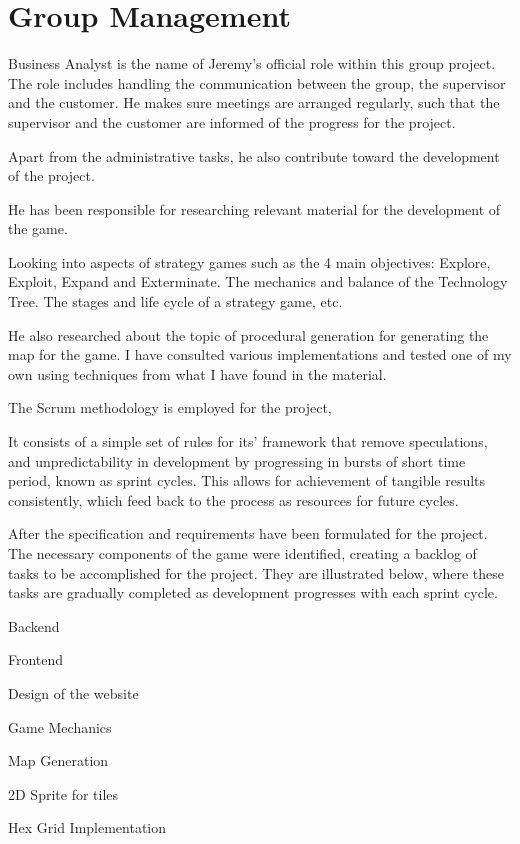 \section*{Group Management}

Business Analyst is the name of Jeremy's official role within this group project. The role includes handling the communication between the group, the supervisor and the customer. He makes sure meetings are arranged regularly, such that the supervisor and the customer are informed of the progress for the project.

Apart from the administrative tasks, he also contribute toward the development of the project. 

He has been responsible for researching relevant material for the development of the game.

Looking into aspects of strategy games such as the 4 main objectives: Explore, Exploit, Expand and Exterminate. The mechanics and balance of the Technology Tree. The stages and life cycle of a strategy game, etc.

He also researched about the topic of procedural generation for generating the map for the game. I have consulted various implementations and tested one of my own using techniques from what I have found in the material.





The Scrum methodology is employed for the project, 

It consists of a simple set of rules for its' framework that remove speculations, and unpredictability in development by progressing in bursts of short time period, known as sprint cycles. This allows for achievement of tangible results consistently, which feed back to the process as resources for future cycles. 

After the specification and requirements have been formulated for the project. The necessary components of the game were identified, creating a backlog of tasks to be accomplished for the project. They are illustrated below, where these tasks are gradually completed as development progresses with each sprint cycle. 

Backend

Frontend

Design of the website 

Game Mechanics

Map Generation

2D Sprite for tiles

Hex Grid Implementation


